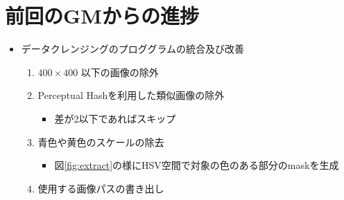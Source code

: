 \documentclass[a4j]{ujarticle}
\newcommand{\Fref}[1]{\mbox{図\ref{fig:#1}}}
\begin{document}
	\section{前回のGMからの進捗}
		\begin{itemize}
			\item データクレンジングのプロググラムの統合及び改善
			\begin{enumerate}
				\item $400 \times 400$ 以下の画像の除外
				\item Perceptual Hashを利用した類似画像の除外
				\begin{itemize}
					\item 差が2以下であればスキップ
				\end{itemize}
				\item 青色や黄色のスケールの除去
				\begin{itemize}
					\item \Fref{extract}の様にHSV空間で対象の色のある部分のmaskを生成
				\end{itemize}
				\item 使用する画像パスの書き出し
			\end{enumerate}
			\begin{figure}[h]
				\centering

\end{figure}
\end{itemize}
\end{document}
